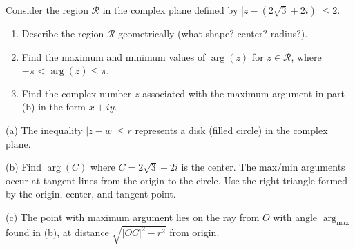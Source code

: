 
\begin{problem}
Consider the region $\mathcal{R}$ in the complex plane defined by $|z - (2\sqrt{3} + 2i)| \leq 2$.

\begin{enumerate}[label=(\alph*)]
\item Describe the region $\mathcal{R}$ geometrically (what shape? center? radius?).
\item Find the maximum and minimum values of $\arg(z)$ for $z \in \mathcal{R}$, where $-\pi < \arg(z) \leq \pi$.
\item Find the complex number $z$ associated with the maximum argument in part (b) in the form $x + iy$.
\end{enumerate}
\end{problem}

\begin{hint}
(a) The inequality $|z - w| \leq r$ represents a disk (filled circle) in the complex plane.

(b) Find $\arg(C)$ where $C = 2\sqrt{3} + 2i$ is the center. The max/min arguments occur at tangent lines from the origin to the circle. Use the right triangle formed by the origin, center, and tangent point.

(c) The point with maximum argument lies on the ray from $O$ with angle $\arg_{\max}$ found in (b), at distance $\sqrt{|OC|^2 - r^2}$ from origin.
\end{hint}

